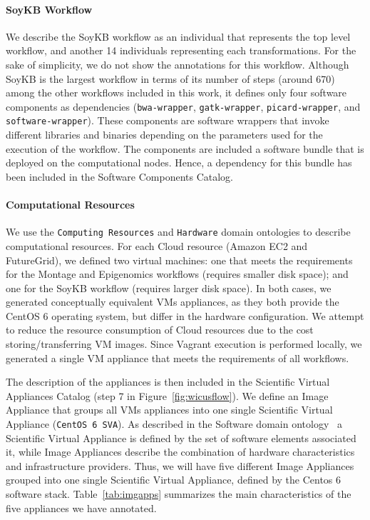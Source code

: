 \paragraph{\textbf{SoyKB Workflow}}
We describe the SoyKB workflow as an individual that represents the top level workflow,
and another 14 individuals representing each transformations. For the sake of simplicity,
we do not show the annotations for this workflow. Although SoyKB is the largest workflow 
in terms of its number of steps (around 670) among the other workflows included in this 
work, it defines only four software components as dependencies (\texttt{bwa-wrapper}, 
\texttt{gatk-wrapper}, \texttt{picard-wrapper}, and \texttt{software-wrapper}). These 
components  are software wrappers that invoke different libraries and binaries depending 
on the parameters used for the execution of the workflow. The components are included 
 a software bundle that is deployed on the computational nodes. Hence, a 
dependency for this bundle has been included in the Software 
Components Catalog.

\paragraph{\textbf{Computational Resources}}
We use the \texttt{Computing Resources} and \texttt{Hardware} domain ontologies 
to describe computational resources. For each Cloud resource (Amazon EC2 and 
FutureGrid), we defined two virtual machines: one that meets the requirements for the 
Montage and Epigenomics workflows (requires smaller disk space); and one for the 
SoyKB workflow (requires larger disk space). In both cases, we generated conceptually 
equivalent VMs appliances, as they both provide the CentOS 6 operating system, but differ
in the hardware configuration. We attempt to reduce the resource consumption of
Cloud resources due to the cost  storing/transferring VM images. Since Vagrant
execution is performed locally, we generated a single VM appliance that meets the 
requirements of all workflows. 

The description of the appliances is then included in the Scientific Virtual Appliances 
Catalog (step 7 in Figure~\ref{fig:wicusflow}). We define  an Image Appliance that groups 
all VMs appliances into one single Scientific Virtual Appliance (\texttt{CentOS 6 SVA}). 
As described in the Software domain ontology~\cite{wicus} a Scientific Virtual Appliance
is defined by the set of software elements associated  it, while Image Appliances 
describe the combination of hardware characteristics and infrastructure providers. Thus, 
we will have five different Image Appliances grouped into one single Scientific Virtual Appliance,
defined by the Centos 6 software stack.
Table~\ref{tab:imgapps} summarizes the main characteristics of the five appliances 
we have annotated.


